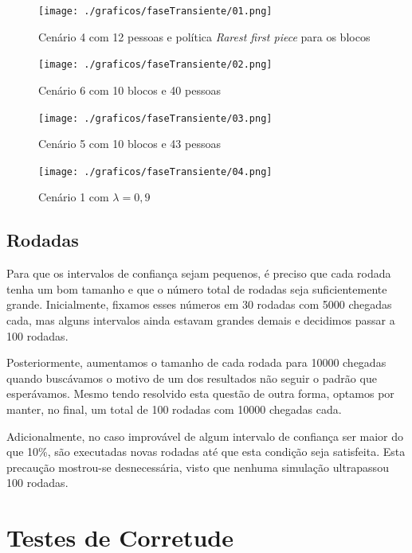 \documentclass[a4paper,10pt]{article}
\begin{document}
\pagebreak

\begin{figure}
	\caption{Cenário 4 com 12 pessoas e política \textit{Rarest first piece} para os blocos}
	\label{grafTransienteCen4b02n12rf}
	\texttt{[image: ./graficos/faseTransiente/01.png]}
\end{figure}

\begin{figure}
	\caption{Cenário 6 com 10 blocos e 40 pessoas}
	\label{grafTransienteCen6b10n40rr}
	\texttt{[image: ./graficos/faseTransiente/02.png]}
\end{figure}

\clearpage

\begin{figure}
	\caption{Cenário 5 com 10 blocos e 43 pessoas}
	\label{grafTransienteCen5b10n43rr}
	\texttt{[image: ./graficos/faseTransiente/03.png]}
\end{figure}

\begin{figure}
	\caption{Cenário 1 com $\lambda = 0,9$}
	\label{grafTransienteCen1lamb0.9}
	\texttt{[image: ./graficos/faseTransiente/04.png]}
\end{figure}

\clearpage
\pagebreak

\subsection{Rodadas}

Para que os intervalos de confiança sejam pequenos, é preciso que cada rodada tenha um bom tamanho e que o número total de rodadas seja suficientemente grande. Inicialmente, fixamos esses números em 30 rodadas com 5000 chegadas cada, mas alguns intervalos ainda estavam grandes demais e decidimos passar a 100 rodadas.

Posteriormente, aumentamos o tamanho de cada rodada para 10000 chegadas quando buscávamos o motivo de um dos resultados não seguir o padrão que esperávamos. Mesmo tendo resolvido esta questão de outra forma, optamos por manter, no final, um total de 100 rodadas com 10000 chegadas cada.

Adicionalmente, no caso improvável de algum intervalo de confiança ser maior do que 10\%, são executadas novas rodadas até que esta condição seja satisfeita. Esta precaução mostrou-se desnecessária, visto que nenhuma simulação ultrapassou 100 rodadas.

\pagebreak

\section{Testes de Corretude}\label{TestesDeCorretude}
\end{document}
